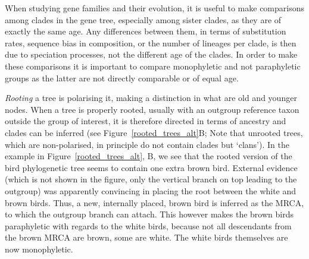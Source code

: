 When studying gene families and their evolution, it is useful to make comparisons among clades in the gene tree, especially among sister clades, as they are of exactly the same age.
Any differences between them, in terms of substitution rates, sequence bias in composition, or the number of lineages per clade, is then due to speciation processes, not the different age of the clades.
In order to make these comparisons it is important to compare monophyletic and not paraphyletic groups as the latter are not directly comparable or of equal age.

\textit{Rooting} a tree is polarising it, making a distinction in what are old and younger nodes.
When a tree is properly rooted, usually with an outgroup reference taxon outside the group of interest, it is therefore directed in terms of ancestry and clades can be inferred (see Figure~\ref{rooted_trees_alt}B; Note that unrooted trees, which are non-polarised, in principle do not contain clades but `clans').
In the example in Figure~\ref{rooted_trees_alt}, B, we see that the rooted version of the bird phylogenetic tree seems to contain one extra brown bird.
External evidence (which is not shown in the figure, only the vertical branch on top leading to the outgroup) was apparently convincing in placing the root between the white and brown birds.
Thus, a new, internally placed, brown bird is inferred as the MRCA, to which the outgroup branch can attach.
This however makes the brown birds paraphyletic with regards to the white birds, because not all descendants from the brown MRCA are brown, some are white.
The white birds themselves are now monophyletic.

% 

